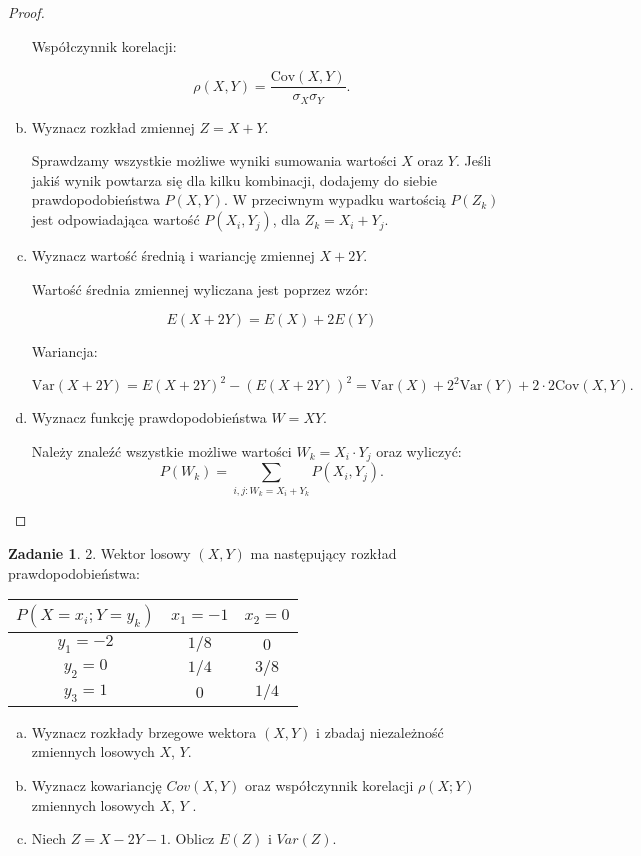 \documentclass[11pt]{article}
\theoremstyle{definition}
\newtheorem{zadanie}{Zadanie}
\newcommand{\Var}{\text{Var}}
\newcommand{\Cov}{\text{Cov}}
\begin{document}
\begin{proof}
\begin{enumerate}[a)]
              Współczynnik korelacji:

              $$\rho(X,Y) = \frac{\Cov(X,Y)}{\sigma_X\sigma_Y}.$$

        \item Wyznacz rozkład zmiennej $Z = X + Y$.

              Sprawdzamy wszystkie możliwe wyniki sumowania wartości $X$ oraz $Y$. Jeśli jakiś wynik powtarza się dla kilku kombinacji, dodajemy do siebie prawdopodobieństwa $P(X,Y)$.
              W przeciwnym wypadku wartością $P(Z_k)$ jest odpowiadająca wartość $P(X_i,Y_j)$, dla $Z_k= X_i+Y_j$.

        \item Wyznacz wartość średnią i wariancję zmiennej $X + 2Y$.

              Wartość średnia zmiennej wyliczana jest poprzez wzór:

              $$E(X+2Y) = E(X) + 2E(Y)$$

              Wariancja:

              $$\Var(X+2Y) = E(X+2Y)^2 - (E(X+2Y))^2 = \Var(X) + 2^2\Var(Y) + 2\cdot 2\Cov(X,Y).$$

        \item Wyznacz funkcję prawdopodobieństwa $W = XY$.

              Należy znaleźć wszystkie możliwe wartości $W_k= X_i\cdot Y_j$ oraz wyliczyć:
              $$P(W_k) = \sum_{i,j:W_k = X_i+Y_k}P(X_i,Y_j).$$

    \end{enumerate}
\end{proof}

\begin{zadanie}
    2. Wektor losowy $(X, Y)$ ma następujący rozkład prawdopodobieństwa:

    \begin{table}[ht]
        \begin{tabular}{|c|c|c|}
            \hline

            $P(X = x_i; Y = y_k)$ & $x_1 = -1$ & $x_2 = 0$ \\
            \hline
            $y_1 =-2$             & $1/8$      & $0$       \\
            $y_2 = 0$             & $1/4$      & $3/8$     \\
            $y_3 = 1$             & $0$        & $1/4$     \\
            \hline
        \end{tabular}
    \end{table}

    \begin{enumerate}[a)]
        \item Wyznacz rozkłady brzegowe wektora $(X, Y)$ i zbadaj niezależność zmiennych losowych $X$, $Y$.
        \item Wyznacz kowariancję $Cov(X, Y)$ oraz współczynnik korelacji $\rho(X; Y )$ zmiennych losowych $X$, $Y$ .
        \item Niech $Z = X - 2Y - 1$. Oblicz $E(Z)$ i $Var(Z)$.
    \end{enumerate}
\end{zadanie}
\end{document}
